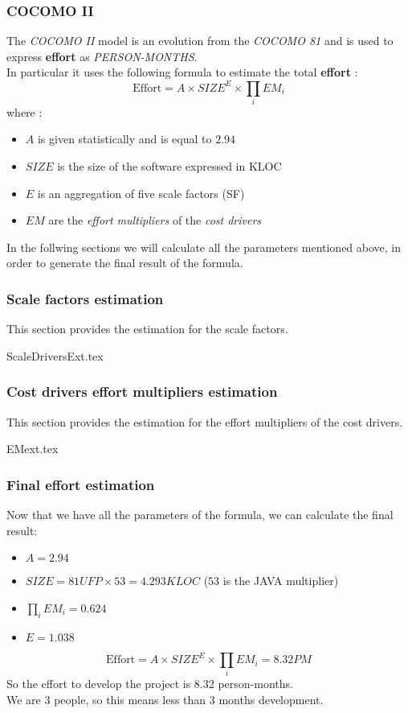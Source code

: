 \subsubsection{COCOMO II}
The \emph{COCOMO II} model is an evolution from the \emph{COCOMO 81} and is used to express \textbf{effort} as \emph{PERSON-MONTHS}.\\
In particular it uses the following formula to estimate the total \textbf{effort} :
\begin{equation}
    \textrm{Effort} = A \times SIZE^E \times \prod_i EM_i
    \label{eq:effort}
\end{equation}
where :
\begin{itemize}
	\item $A$ is given statistically and is equal to $2.94$
	\item $SIZE$ is the size of the software expressed in KLOC
	\item $E$ is an aggregation of five scale factors (SF) 
	\item $EM$ are the \emph{effort multipliers} of the \emph{cost drivers} 
\end{itemize}
In the follwing sections we will calculate all the parameters mentioned above, in order to generate the final result of the formula.

\subsubsection{Scale factors estimation}
\label{sub:scale_factors}
This section provides the estimation for the scale factors.

{ScaleDriversExt.tex}



\subsubsection{Cost drivers effort multipliers estimation}
\label{sub:cost_drivers}
This section provides the estimation for the effort multipliers of the cost drivers.

{EMext.tex}

\subsubsection{Final effort estimation}
\label{sub:effort_estimation}
Now that we have all the parameters of the formula, we can calculate the final result:
\begin{itemize}
	\item $A = 2.94$
	\item $SIZE = 81UFP  \times  53  = 4.293  KLOC$ ($53$ is the JAVA multiplier)
	\item $\prod_i EM_i = 0.624$
	\item $E = 1.038$
\end{itemize}

\begin{equation}
    \textrm{Effort} = A \times SIZE^E \times \prod_i EM_i = 8.32 PM
    \label{eq:effort}
\end{equation}
So the effort to develop the project is 8.32 person-months.\\
We are 3 people, so this means less than 3 months development. 
